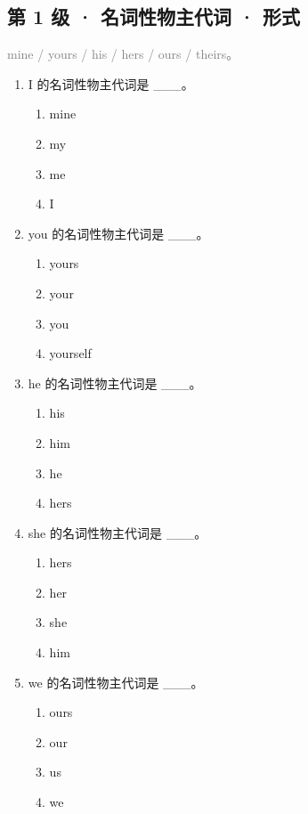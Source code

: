 \documentclass[11pt,a4paper]{ctexart}
\begin{document}
\subsection*{第 1 级 · 名词性物主代词 · 形式}
\noindent\textcolor{gray}{mine / yours / his / hers / ours / theirs。}\par\smallskip
\begin{enumerate}[leftmargin=*,itemsep=4pt]
\item I 的名词性物主代词是 \_\_\_。
\begin{enumerate}[label=\Alph*.,leftmargin=2em,itemsep=1pt,topsep=2pt]
\item mine
\item my
\item me
\item I
\end{enumerate}
\item you 的名词性物主代词是 \_\_\_。
\begin{enumerate}[label=\Alph*.,leftmargin=2em,itemsep=1pt,topsep=2pt]
\item yours
\item your
\item you
\item yourself
\end{enumerate}
\item he 的名词性物主代词是 \_\_\_。
\begin{enumerate}[label=\Alph*.,leftmargin=2em,itemsep=1pt,topsep=2pt]
\item his
\item him
\item he
\item hers
\end{enumerate}
\item she 的名词性物主代词是 \_\_\_。
\begin{enumerate}[label=\Alph*.,leftmargin=2em,itemsep=1pt,topsep=2pt]
\item hers
\item her
\item she
\item him
\end{enumerate}
\item we 的名词性物主代词是 \_\_\_。
\begin{enumerate}[label=\Alph*.,leftmargin=2em,itemsep=1pt,topsep=2pt]
\item ours
\item our
\item us
\item we
\end{enumerate}

\end{enumerate}
\end{document}
